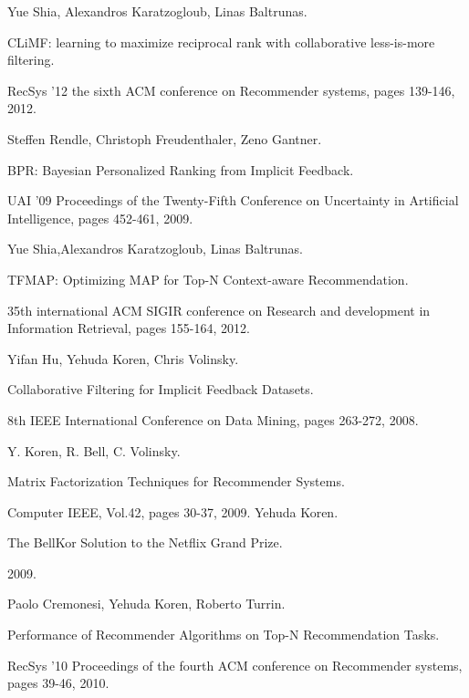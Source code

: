 \documentclass[14pt]{extarticle}
\begin{document}
	\begin{thebibliography}{00} %
    	
    	Yue Shia, Alexandros Karatzogloub, Linas Baltrunas.
    	
CLiMF: learning to maximize reciprocal rank with collaborative less-is-more filtering. 	
    	
    RecSys '12 the sixth ACM conference on Recommender systems, pages 139-146,  2012.    	
    	
         
	     Steffen Rendle, Christoph Freudenthaler, Zeno Gantner.    
         
         BPR: Bayesian Personalized Ranking from Implicit Feedback.
         
         UAI '09 Proceedings of the Twenty-Fifth Conference on Uncertainty in Artificial Intelligence, pages 452-461,  2009.
         
		
		Yue Shia,Alexandros Karatzogloub, Linas Baltrunas.
		
TFMAP: Optimizing MAP for Top-N Context-aware Recommendation.		
		
		35th international ACM SIGIR conference on Research and development in Information Retrieval, pages 155-164, 2012.
		
	Yifan Hu, Yehuda Koren, Chris Volinsky.
	
	Collaborative Filtering for Implicit Feedback Datasets.
	
	8th IEEE International Conference on Data Mining, pages 263-272, 2008.
	
	
	Y. Koren, R. Bell, C. Volinsky.	
	
	Matrix Factorization Techniques for Recommender Systems.
		
	
	Computer IEEE, Vol.42, pages 30-37, 2009.
	Yehuda Koren.
	
	The BellKor Solution to the Netflix Grand Prize. 
	
	2009.

	
    Paolo Cremonesi, Yehuda Koren, Roberto Turrin.	
	
	Performance of Recommender Algorithms on Top-N Recommendation Tasks.
	
	RecSys '10 Proceedings of the fourth ACM conference on Recommender systems, pages 39-46, 2010.
	

\end{thebibliography}
\end{document}
